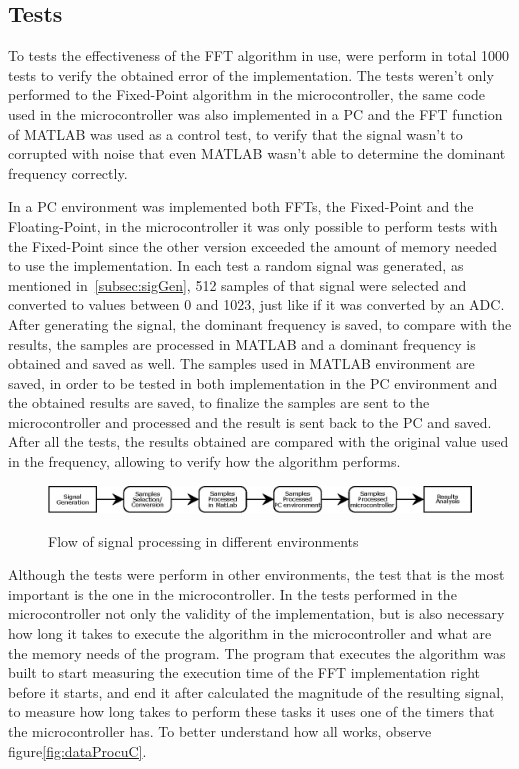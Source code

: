 \subsection{Tests}
To tests the effectiveness of the FFT algorithm in use, were perform in total 1000 tests to verify the obtained error of the implementation. The tests weren't only performed to the Fixed-Point algorithm in the microcontroller, the same code used in the microcontroller was also implemented in a PC and the FFT function of MATLAB was used as a control test, to verify that the signal wasn't to corrupted with noise that even MATLAB wasn't able to determine the dominant frequency correctly.

In a PC environment was implemented both FFTs, the Fixed-Point and the Floating-Point, in the microcontroller it was only possible to perform tests with the Fixed-Point since the other version exceeded the amount of memory needed to use the implementation. In each test a random signal was generated, as mentioned in~\ref{subsec:sigGen}, 512 samples of that signal were selected and converted to values between 0 and 1023, just like if it was converted by an ADC. After generating the signal, the dominant frequency is saved, to compare with the results, the samples are processed in MATLAB and a dominant frequency is obtained and saved as well. The samples used in MATLAB environment are saved, in order to be tested in both implementation in the PC environment and the obtained results are saved, to finalize the samples are sent to the microcontroller and processed and the result is sent back to the PC and saved. After all the tests, the results obtained are compared with the original value used in the frequency, allowing to verify how the algorithm performs. 
\begin{figure}[]
    \centering
    \includegraphics[width=1\textwidth]{Chapters/6CHP/Figures/ProcFlow.eps}
    \caption{Flow of signal processing in different environments}{}
    \label{fig:flowProc}
\end{figure}
Although the tests were perform in other environments, the test that is the most important is the one in the microcontroller. In the tests performed in the microcontroller not only the validity of the implementation, but is also necessary how long it takes to execute the algorithm in the microcontroller and what are the memory needs of the program. The program that executes the algorithm was built to start measuring the execution time of the FFT implementation right before it starts, and end it after calculated the magnitude of the resulting signal, to measure how long takes to perform these tasks it uses one of the timers that the microcontroller has. To better understand how all works, observe figure\ref{fig:dataProcuC}.
